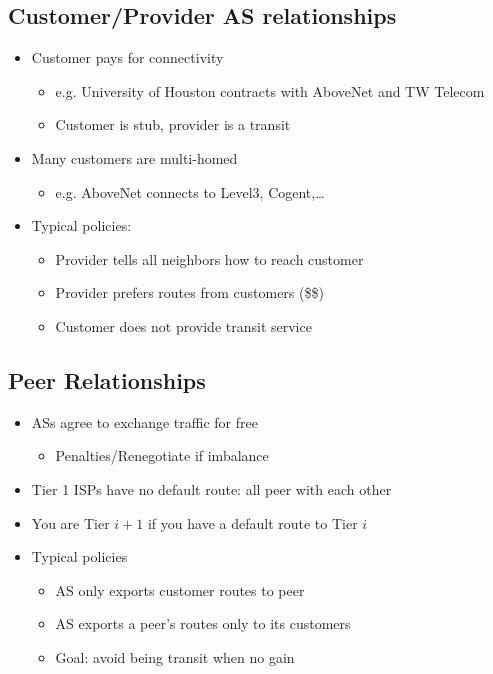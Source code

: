 \subsection{Customer/Provider AS relationships}
\begin{itemize}[nosep]
    \item Customer pays for connectivity
          \begin{itemize}[nosep]
              \item e.g. University of Houston contracts with AboveNet and TW Telecom
              \item Customer is stub, provider is a transit
          \end{itemize}
    \item Many customers are multi-homed
          \begin{itemize}[nosep]
              \item e.g. AboveNet connects to Level3, Cogent,\dots
          \end{itemize}
    \item Typical policies:
          \begin{itemize}[nosep]
              \item Provider tells all neighbors how to reach customer
              \item Provider prefers routes from customers (\$\$)
              \item Customer does not provide transit service
          \end{itemize}
\end{itemize}

\subsection{Peer Relationships}
\begin{itemize}[nosep]
    \item ASs agree to exchange traffic for free
          \begin{itemize}[nosep]
              \item Penalties/Renegotiate if imbalance
          \end{itemize}
    \item Tier 1 ISPs have no default route: all peer with each other
    \item You are Tier $i + 1$ if you have a default route to Tier $i$
    \item Typical policies
          \begin{itemize}[nosep]
              \item AS only exports customer routes to peer
              \item AS exports a peer's routes only to its customers
              \item Goal: avoid being transit when no gain
          \end{itemize}
\end{itemize}


